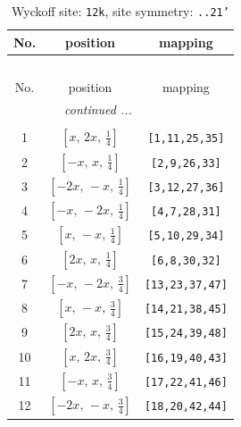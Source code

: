\documentclass[fleqn,8pt]{jsarticle}
\begin{document}
\begin{longtable}{ccc}
\caption{Wyckoff site: {\tt 12k}, site symmetry: {\tt ..21'}}
 \\
 \hline \hline
No. & position & mapping \\ \hline \endfirsthead

\multicolumn{2}{l}{\tablename\ \thetable{}} \\
 \hline \hline
No. & position & mapping \\ \hline \endhead

 \hline \hline
\multicolumn{2}{r}{\footnotesize\it continued ...} \\ \endfoot

 \hline \hline
\multicolumn{2}{r}{} \\ \endlastfoot

1 & $\left[ x,\, 2 x,\, \frac{1}{4} \right]$ & {\tt [1,11,25,35]} \\ \hline
2 & $\left[ - x,\, x,\, \frac{1}{4} \right]$ & {\tt [2,9,26,33]} \\ \hline
3 & $\left[ - 2 x,\, - x,\, \frac{1}{4} \right]$ & {\tt [3,12,27,36]} \\ \hline
4 & $\left[ - x,\, - 2 x,\, \frac{1}{4} \right]$ & {\tt [4,7,28,31]} \\ \hline
5 & $\left[ x,\, - x,\, \frac{1}{4} \right]$ & {\tt [5,10,29,34]} \\ \hline
6 & $\left[ 2 x,\, x,\, \frac{1}{4} \right]$ & {\tt [6,8,30,32]} \\ \hline
7 & $\left[ - x,\, - 2 x,\, \frac{3}{4} \right]$ & {\tt [13,23,37,47]} \\ \hline
8 & $\left[ x,\, - x,\, \frac{3}{4} \right]$ & {\tt [14,21,38,45]} \\ \hline
9 & $\left[ 2 x,\, x,\, \frac{3}{4} \right]$ & {\tt [15,24,39,48]} \\ \hline
10 & $\left[ x,\, 2 x,\, \frac{3}{4} \right]$ & {\tt [16,19,40,43]} \\ \hline
11 & $\left[ - x,\, x,\, \frac{3}{4} \right]$ & {\tt [17,22,41,46]} \\ \hline
12 & $\left[ - 2 x,\, - x,\, \frac{3}{4} \right]$ & {\tt [18,20,42,44]} \\
\end{longtable}
\renewcommand{\arraystretch}{1.2}
\end{document}
